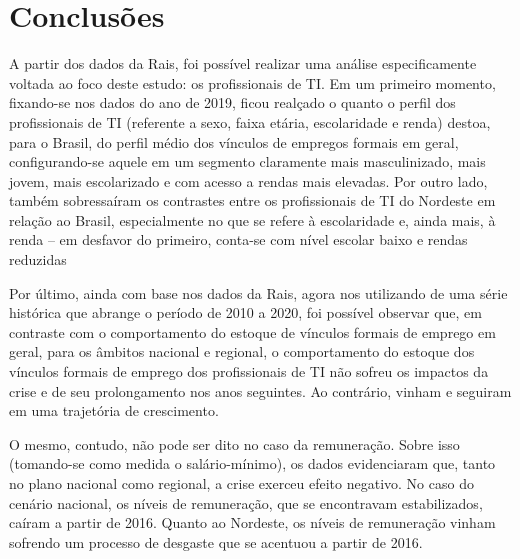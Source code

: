 \section{Conclusões}

A partir dos dados da Rais, foi possível realizar uma análise especificamente voltada ao foco deste estudo: os profissionais de TI. Em um primeiro momento, fixando-se nos dados do ano de 2019, ficou realçado o quanto o perfil dos profissionais de TI (referente a sexo, faixa etária, escolaridade e renda) destoa, para o Brasil, do perfil médio dos vínculos de empregos formais em geral, configurando-se aquele em um segmento claramente mais masculinizado, mais jovem, mais escolarizado e com acesso a rendas mais elevadas. Por outro lado, também sobressaíram os contrastes entre os profissionais de TI do Nordeste em relação ao Brasil, especialmente no que se refere à escolaridade e, ainda mais, à renda – em desfavor do primeiro, conta-se com nível escolar baixo e rendas reduzidas

Por último, ainda com base nos dados da Rais, agora nos utilizando de uma série histórica que abrange o período de 2010 a 2020, foi possível observar que, em contraste com o comportamento do estoque de vínculos formais de emprego em geral, para os âmbitos nacional e regional, o comportamento do estoque dos vínculos formais de emprego dos profissionais de TI não sofreu os impactos da crise e de seu prolongamento nos anos seguintes. Ao contrário, vinham e seguiram em uma trajetória de crescimento.

O mesmo, contudo, não pode ser dito no caso da remuneração. Sobre isso (tomando-se como medida o salário-mínimo), os dados evidenciaram que, tanto no plano nacional como regional, a crise exerceu efeito negativo. No caso do cenário nacional, os níveis de remuneração, que se encontravam estabilizados, caíram a partir de 2016. Quanto ao Nordeste, os níveis de remuneração vinham sofrendo um processo de desgaste que se acentuou a partir de 2016.